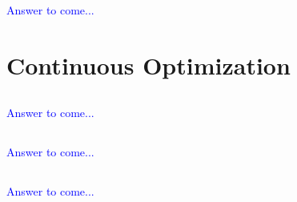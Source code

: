 \documentclass[a4paper,12pt]{article}
\begin{document}
\subsection{}

\textcolor{blue}{
Answer to come...
}
\newpage%
\section{Continuous Optimization}
\subsection{}

\textcolor{blue}{
Answer to come...
}
\subsection{}

\textcolor{blue}{
Answer to come...
}
\subsection{}

\textcolor{blue}{
Answer to come...
}
\end{document}
